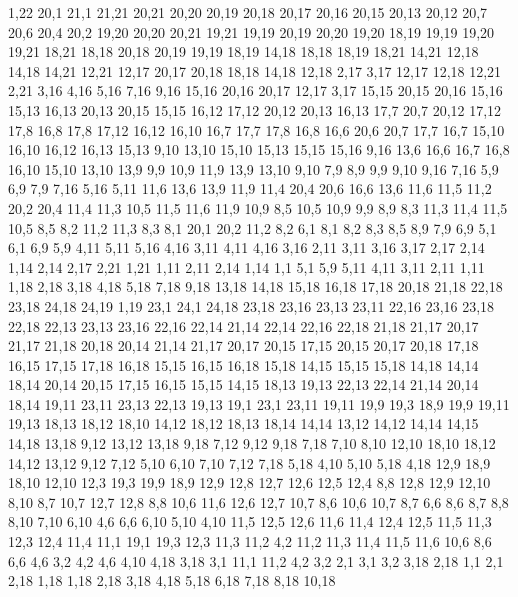 1,22
%
20,1
21,1
21,21
20,21
20,20
20,19
20,18
20,17
20,16
20,15
20,13
20,12
20,7
20,6
20,4
20,2
%
19,20
20,20
20,21
19,21
%
19,19
20,19
20,20
19,20
%
18,19
19,19
19,20
19,21
18,21
%
18,18
20,18
20,19
19,19
18,19
%
14,18
18,18
18,19
18,21
14,21
%
12,18
14,18
14,21
12,21
%
12,17
20,17
20,18
18,18
14,18
12,18
%
2,17
3,17
12,17
12,18
12,21
2,21
%
3,16
4,16
5,16
7,16
9,16
15,16
20,16
20,17
12,17
3,17
%
15,15
20,15
20,16
15,16
%
15,13
16,13
20,13
20,15
15,15
%
16,12
17,12
20,12
20,13
16,13
%
17,7
20,7
20,12
17,12
17,8
%
16,8
17,8
17,12
16,12
16,10
%
16,7
17,7
17,8
16,8
%
16,6
20,6
20,7
17,7
16,7
%
15,10
16,10
16,12
16,13
15,13
%
9,10
13,10
15,10
15,13
15,15
15,16
9,16
%
13,6
16,6
16,7
16,8
16,10
15,10
13,10
13,9
%
9,9
10,9
11,9
13,9
13,10
9,10
%
7,9
8,9
9,9
9,10
9,16
7,16
%
5,9
6,9
7,9
7,16
5,16
5,11
%
11,6
13,6
13,9
11,9
%
11,4
20,4
20,6
16,6
13,6
11,6
11,5
%
11,2
20,2
20,4
11,4
11,3
%
10,5
11,5
11,6
11,9
10,9
%
8,5
10,5
10,9
9,9
8,9
%
8,3
11,3
11,4
11,5
10,5
8,5
%
8,2
11,2
11,3
8,3
%
8,1
20,1
20,2
11,2
8,2
%
6,1
8,1
8,2
8,3
8,5
8,9
7,9
6,9
%
5,1
6,1
6,9
5,9
%
4,11
5,11
5,16
4,16
%
3,11
4,11
4,16
3,16
%
2,11
3,11
3,16
3,17
2,17
2,14
%
1,14
2,14
2,17
2,21
1,21
%
1,11
2,11
2,14
1,14
%
1,1
5,1
5,9
5,11
4,11
3,11
2,11
1,11
1,18
2,18
3,18
4,18
5,18
7,18
9,18
13,18
14,18
15,18
16,18
17,18
20,18
21,18
22,18
23,18
24,18
24,19
1,19
%
23,1
24,1
24,18
23,18
23,16
23,13
23,11
%
22,16
23,16
23,18
22,18
%
22,13
23,13
23,16
22,16
22,14
%
21,14
22,14
22,16
22,18
21,18
21,17
%
20,17
21,17
21,18
20,18
%
20,14
21,14
21,17
20,17
20,15
%
17,15
20,15
20,17
20,18
17,18
%
16,15
17,15
17,18
16,18
%
15,15
16,15
16,18
15,18
%
14,15
15,15
15,18
14,18
%
14,14
18,14
20,14
20,15
17,15
16,15
15,15
14,15
%
18,13
19,13
22,13
22,14
21,14
20,14
18,14
%
19,11
23,11
23,13
22,13
19,13
%
19,1
23,1
23,11
19,11
19,9
19,3
%
18,9
19,9
19,11
19,13
18,13
18,12
18,10
%
14,12
18,12
18,13
18,14
14,14
%
13,12
14,12
14,14
14,15
14,18
13,18
%
9,12
13,12
13,18
9,18
%
7,12
9,12
9,18
7,18
%
7,10
8,10
12,10
18,10
18,12
14,12
13,12
9,12
7,12
%
5,10
6,10
7,10
7,12
7,18
5,18
%
4,10
5,10
5,18
4,18
%
12,9
18,9
18,10
12,10
%
12,3
19,3
19,9
18,9
12,9
12,8
12,7
12,6
12,5
12,4
%
8,8
12,8
12,9
12,10
8,10
%
8,7
10,7
12,7
12,8
8,8
%
10,6
11,6
12,6
12,7
10,7
%
8,6
10,6
10,7
8,7
%
6,6
8,6
8,7
8,8
8,10
7,10
6,10
%
4,6
6,6
6,10
5,10
4,10
%
11,5
12,5
12,6
11,6
%
11,4
12,4
12,5
11,5
%
11,3
12,3
12,4
11,4
%
11,1
19,1
19,3
12,3
11,3
11,2
%
4,2
11,2
11,3
11,4
11,5
11,6
10,6
8,6
6,6
4,6
%
3,2
4,2
4,6
4,10
4,18
3,18
%
3,1
11,1
11,2
4,2
3,2
%
2,1
3,1
3,2
3,18
2,18
%
1,1
2,1
2,18
1,18
1,18
2,18
3,18
4,18
5,18
6,18
7,18
8,18
10,18
